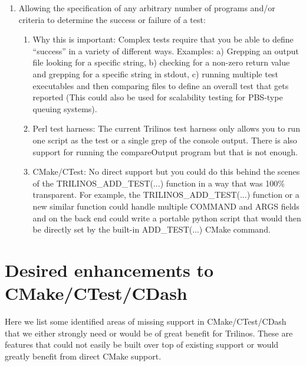 \documentclass[pdf,ps2pdf,11pt]{SANDreport}
\begin{document}
\begin{enumerate}
\begin{enumerate}
  \end{enumerate}

{}\item Allowing the specification of any arbitrary number of programs
and/or criteria to determine the success or failure of a test:

  \begin{enumerate}

  {}\item Why this is important: Complex tests require that you be
  able to define ``success'' in a variety of different ways.
  Examples: a) Grepping an output file looking for a specific string,
  b) checking for a non-zero return value and grepping for a specific
  string in stdout, c) running multiple test executables and then
  comparing files to define an overall test that gets reported (This
  could also be used for scalability testing for PBS-type queuing
  systems).

  {}\item Perl test harness: The current Trilinos test harness only
  allows you to run one script as the test or a single grep of the
  console output.  There is also support for running the compareOutput
  program but that is not enough.

  {}\item CMake/CTest: No direct support but you could do this behind
  the scenes of the TRILINOS\_ADD\_TEST(...) function in a way that
  was 100\% transparent.  For example, the TRILINOS\_ADD\_TEST(...) 
  function or a new similar function could handle multiple COMMAND and
  ARGS fields and on the back end could write a portable python script
  that would then be directly set by the built-in ADD\_TEST(...) CMake
  command.

  \end{enumerate}

\end{enumerate}

%
\section{Desired enhancements to CMake/CTest/CDash}
%

Here we list some identified areas of missing support in
CMake/CTest/CDash that we either strongly need or would be of great
benefit for Trilinos.  These are features that could not easily be
built over top of existing support or would greatly benefit from
direct CMake support.
\end{document}
